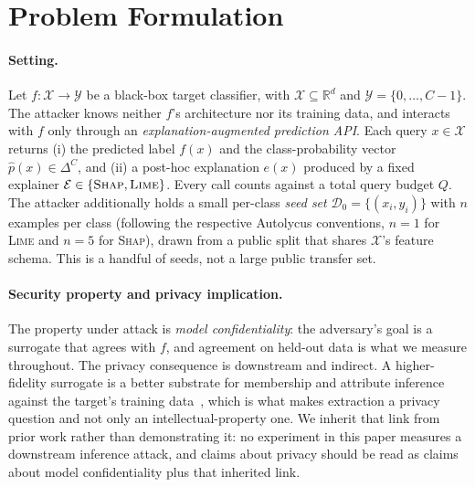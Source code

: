 \documentclass[sigconf,anonymous,review]{acmart}
\begin{document}
\section{Problem Formulation}
\label{sec:problem}

\paragraph{Setting.}
Let $f : \mathcal{X} \to \mathcal{Y}$ be a black-box target classifier, with
$\mathcal{X} \subseteq \mathbb{R}^d$ and $\mathcal{Y} = \{0, \ldots, C{-}1\}$.
The attacker knows neither $f$'s architecture nor its training data, and interacts
with $f$ only through an \emph{explanation-augmented prediction API}.
Each query $x \in \mathcal{X}$ returns (i) the predicted label $f(x)$ and the
class-probability vector $\hat{p}(x) \in \Delta^{C}$, and (ii) a post-hoc
explanation $e(x)$ produced by a fixed explainer
$\mathcal{E} \in \{\textsc{Shap}, \textsc{Lime}\}$.
Every call counts against a total query budget $Q$.
The attacker additionally holds a small per-class \emph{seed set}
$\mathcal{D}_{0} = \{(x_i, y_i)\}$ with $n$ examples per class (following the respective
Autolycus conventions, $n{=}1$ for \textsc{Lime} and $n{=}5$ for \textsc{Shap}), drawn from a
public split that shares $\mathcal{X}$'s feature schema. This is a handful of seeds, not a large public transfer set.

\paragraph{Security property and privacy implication.}
The property under attack is \emph{model confidentiality}: the adversary's goal is a surrogate that
agrees with $f$, and agreement on held-out data is what we measure throughout. The privacy
consequence is downstream and indirect. A higher-fidelity surrogate is a better substrate for
membership and attribute inference against the target's training
data~\cite{oksuz2026lomime,nguyen2024survey}, which is what makes
extraction a privacy question and not only an intellectual-property one. We inherit that link from
prior work rather than demonstrating it: no experiment in this paper measures a downstream inference
attack, and claims about privacy should be read as claims about model confidentiality plus that
inherited link.
\end{document}

